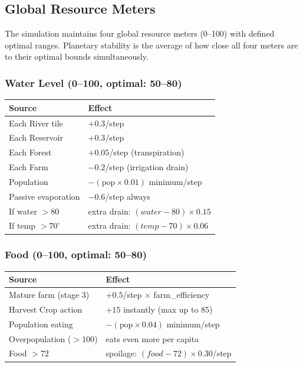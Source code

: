 \documentclass[12pt,a4paper]{article}
\begin{document}
\subsection{Global Resource Meters}

The simulation maintains four global resource meters (0--100) with defined optimal ranges. Planetary stability is the average of how close all four meters are to their optimal bounds simultaneously.

\vspace{0.3cm}
\subsubsection*{Water Level (0--100, optimal: 50--80)}
\vspace{0.1cm}
\begin{center}
\small
\begin{tabular}{ll}
\toprule
\textbf{Source} & \textbf{Effect} \\
\midrule
Each River tile      & $+0.3$/step \\
Each Reservoir       & $+0.3$/step \\
Each Forest          & $+0.05$/step (transpiration) \\
Each Farm            & $-0.2$/step (irrigation drain) \\
Population           & $-(\text{pop} \times 0.01)$ minimum/step \\
Passive evaporation  & $-0.6$/step always \\
If water $> 80$      & extra drain: $(water - 80) \times 0.15$ \\
If temp $> 70^\circ$ & extra drain: $(temp - 70) \times 0.06$ \\
\bottomrule
\end{tabular}
\end{center}

\vspace{0.3cm}
\subsubsection*{Food (0--100, optimal: 50--80)}
\vspace{0.1cm}
\begin{center}
\small
\begin{tabular}{ll}
\toprule
\textbf{Source} & \textbf{Effect} \\
\midrule
Mature farm (stage 3)       & $+0.5$/step $\times$ farm\_efficiency \\
Harvest Crop action         & $+15$ instantly (max up to 85) \\
Population eating           & $-(\text{pop} \times 0.04)$ minimum/step \\
Overpopulation ($> 100$)    & eats even more per capita \\
Food $> 72$                 & spoilage: $(food - 72) \times 0.30$/step \\
\bottomrule
\end{tabular}
\end{center}
\end{document}
